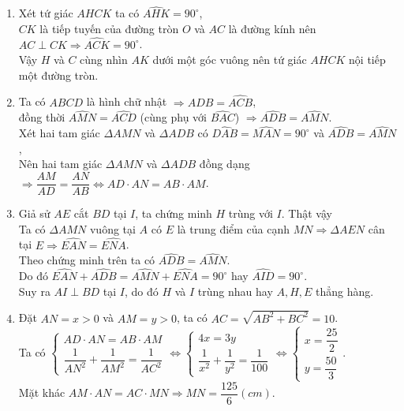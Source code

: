 \begin{bt}
{\begin{enumerate}
			\item Xét tứ giác $AHCK$ ta có $\widehat{AHK} = 90^{\circ}$,\\
$CK$ là tiếp tuyến của đường tròn $O$ và $AC$ là đường kính nên $AC \perp CK \Rightarrow \widehat{ACK} = 90^{\circ}$.\\
Vậy $H$ và $C$ cùng nhìn $AK$ dưới một góc vuông nên tứ giác $AHCK$ nội tiếp một đường tròn.
			\item Ta có $ABCD$ là hình chữ nhật $\Rightarrow \widehat{ADB} = \widehat{ACB}$,\\
đồng thời $\widehat{AMN} = \widehat{ACD}$ (cùng phụ với $\widehat{BAC}$) $\Rightarrow \widehat{ADB} = \widehat{AMN}$.\\
Xét hai tam giác $\Delta AMN$ và $\Delta ADB$ có $\widehat{DAB} = \widehat{MAN} = 90^{\circ}$ và $\widehat{ADB} = \widehat{AMN}$,\\
Nên hai tam giác $\Delta AMN$ và $\Delta ADB$ đồng dạng $\Rightarrow \dfrac{AM}{AD} = \dfrac{AN}{AB} \Leftrightarrow AD\cdot AN = AB\cdot AM$.
             \item Giả sử $AE$ cắt $BD$ tại $I$, ta chứng minh $H$ trùng với $I$. Thật vậy\\
Ta có $\Delta AMN$ vuông tại $A$ có $E$ là trung điểm của cạnh $MN \Rightarrow \Delta AEN$ cân tại $E \Rightarrow \widehat{EAN} = \widehat{ENA}$.\\
Theo chứng minh trên ta có $\widehat{ADB} = \widehat{AMN}$.\\
Do đó $\widehat{EAN} + \widehat{ADB} = \widehat{AMN} + \widehat{ENA} = 90^{\circ}$ hay $\widehat{AID} = 90^{\circ}$.\\
Suy ra $AI \perp BD$ tại $I$, do đó $H$ và $I$ trùng nhau hay $A, H, E$ thẳng hàng.
			\item Đặt $AN = x > 0$ và $AM = y > 0$, ta có $AC = \sqrt{AB^2 + BC^2} = 10$.\\
Ta có $\begin{cases} AD\cdot AN = AB\cdot AM \\ \dfrac{1}{AN^2} + \dfrac{1}{AM^2} = \dfrac{1}{AC^2}\end{cases} \Leftrightarrow \begin{cases} 4x = 3y \\ \dfrac{1}{x^2} + \dfrac{1}{y^2}  = \dfrac{1}{100}\end{cases} \Leftrightarrow \begin{cases} x = \dfrac{25}{2} \\ y = \dfrac{50}{3} \end{cases}$.\\
Mặt khác $AM \cdot AN = AC\cdot MN \Rightarrow MN = \dfrac{125}{6} (cm)$.
		\end{enumerate}	}
\end{bt}

